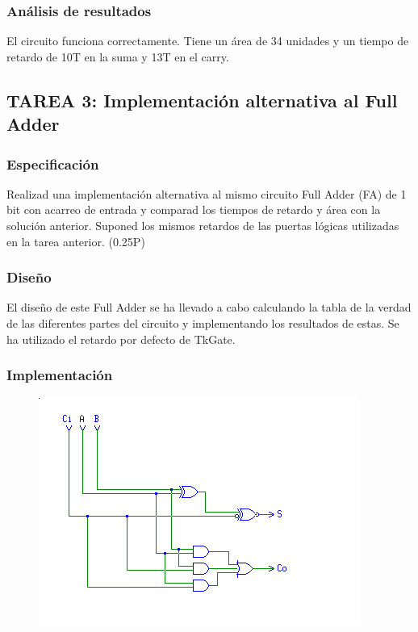 \documentclass{article}
\begin{document}
		\subsubsection*{Análisis de resultados}
		El circuito funciona correctamente. Tiene un área de 34 unidades y un tiempo de retardo de 10T en la suma y 13T en el carry.


	\subsection{TAREA 3: Implementación alternativa al Full Adder}
		\subsubsection*{Especificación}
		Realizad una implementación alternativa al mismo circuito Full Adder (FA) de 1 bit con acarreo de entrada y comparad los tiempos de retardo y área con la solución anterior.
		Suponed los mismos retardos de las puertas lógicas utilizadas en la tarea anterior. (0.25P)

		\subsubsection*{Diseño}
		El diseño de este Full Adder se ha llevado a cabo calculando la tabla de la verdad de las diferentes partes del circuito y implementando los resultados de estas. Se ha utilizado el retardo por defecto de TkGate.


		\subsubsection*{Implementación}
		 \begin{figure}[ht]
		 	\includegraphics[width=0.8\linewidth]{FAA}
			\centering
		 \end{figure}
\end{document}

